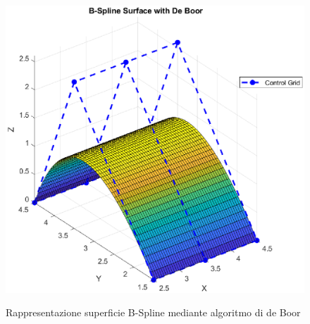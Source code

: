 \documentclass[a4paper, 12pt]{article}
\begin{document}

\begin{figure}[h!]
	\centering
	\caption{Rappresentazione superficie B-Spline mediante algoritmo di de Boor}
	\includegraphics[scale=0.7]{surface_de_boor_plot.eps}
	\label{fig:BSpline_surface_DeBoor}
\end{figure}
\end{document}
